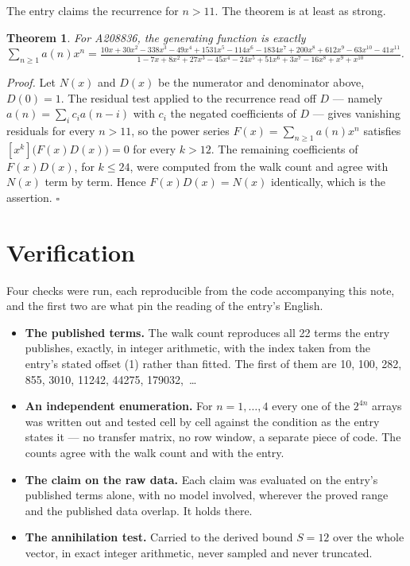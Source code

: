 \documentclass[11pt]{article}
\newtheorem{theorem}{Theorem}
\theoremstyle{definition}
\begin{document}
The entry claims the recurrence for $n > 11$. The theorem is at least as strong.

\begin{theorem} For A208836, the generating function is exactly $\sum_{n\ge 1} a(n)x^n = \frac{10x + 30x^{2} - 338x^{3} - 49x^{4} + 1531x^{5} - 114x^{6} - 1834x^{7} + 200x^{8} + 612x^{9} - 63x^{10} - 41x^{11}}{1 - 7x + 8x^{2} + 27x^{3} - 45x^{4} - 24x^{5} + 51x^{6} + 3x^{7} - 16x^{8} + x^{9} + x^{10}}$.\end{theorem}

{\itshape Proof.} Let $N(x)$ and $D(x)$ be the numerator and denominator above, $D(0)=1$. The residual test applied to the recurrence read off $D$ --- namely $a(n) = \sum_i c_i a(n-i)$ with $c_i$ the negated coefficients of $D$ --- gives vanishing residuals for every $n > 11$, so the power series $F(x)=\sum_{n\ge 1}a(n)x^n$ satisfies $[x^k]\bigl(F(x)D(x)\bigr) = 0$ for every $k > 12$. The remaining coefficients of $F(x)D(x)$, for $k \le 24$, were computed from the walk count and agree with $N(x)$ term by term. Hence $F(x)D(x) = N(x)$ identically, which is the assertion. $\square$

\section{Verification}

Four checks were run, each reproducible from the code accompanying this note, and the first two are what pin the reading of the entry's English.

\begin{itemize}

\item {\bfseries The published terms.} The walk count reproduces all 22 terms the entry publishes, exactly, in integer arithmetic, with the index taken from the entry's stated offset (1) rather than fitted. The first of them are 10, 100, 282, 855, 3010, 11242, 44275, 179032,~\dots

\item {\bfseries An independent enumeration.} For $n = 1,\dots,4$ every one of the $2^{4n}$ arrays was written out and tested cell by cell against the condition as the entry states it --- no transfer matrix, no row window, a separate piece of code. The counts agree with the walk count and with the entry.

\item {\bfseries The claim on the raw data.} Each claim was evaluated on the entry's published terms alone, with no model involved, wherever the proved range and the published data overlap. It holds there.

\item {\bfseries The annihilation test.} Carried to the derived bound $S = 12$ over the whole vector, in exact integer arithmetic, never sampled and never truncated.

\end{itemize}
\end{document}
